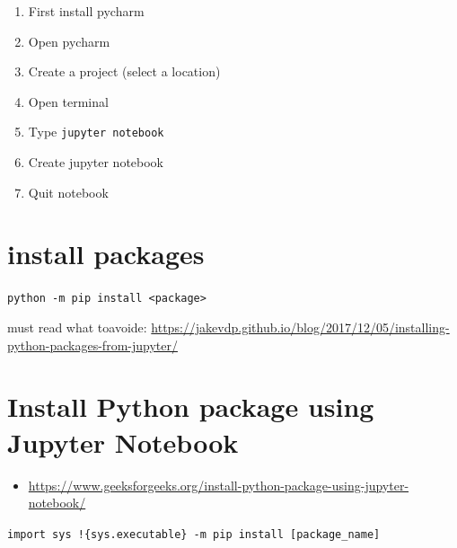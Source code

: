 \documentclass[
]{book}
\providecommand{\tightlist}{%
  \setlength{\itemsep}{0pt}\setlength{\parskip}{0pt}}
\begin{document}
\begin{enumerate}
\def\labelenumi{\arabic{enumi}.}
\tightlist
\item
  First install pycharm
\item
  Open pycharm
\item
  Create a project (select a location)
\item
  Open terminal
\item
  Type \texttt{jupyter\ notebook}
\item
  Create jupyter notebook
\item
  Quit notebook
\end{enumerate}

\hypertarget{install-packages}{%
\section{install packages}\label{install-packages}}

\texttt{python\ -m\ pip\ install\ \textless{}package\textgreater{}}

must read what toavoide: \url{https://jakevdp.github.io/blog/2017/12/05/installing-python-packages-from-jupyter/}

\hypertarget{install-python-package-using-jupyter-notebook}{%
\section{Install Python package using Jupyter Notebook}\label{install-python-package-using-jupyter-notebook}}

\begin{itemize}
\tightlist
\item
  \url{https://www.geeksforgeeks.org/install-python-package-using-jupyter-notebook/}
\end{itemize}

\texttt{import\ sys\ !\{sys.executable\}\ -m\ pip\ install\ {[}package\_name{]}}

  
\end{document}
